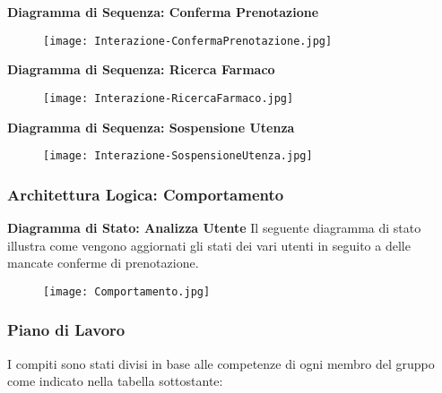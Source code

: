 \textbf{Diagramma di Sequenza: Conferma Prenotazione}

\begin{figure}[h!]
    \begin{center}
        \texttt{[image: Interazione-ConfermaPrenotazione.jpg]}
    \end{center}
\end{figure}
\newpage

\textbf{Diagramma di Sequenza: Ricerca Farmaco}

\begin{figure}[h!]
    \begin{center}
        \texttt{[image: Interazione-RicercaFarmaco.jpg]}
    \end{center}
\end{figure}
\hfill \break

\textbf{Diagramma di Sequenza: Sospensione Utenza}

\begin{figure}[h!]
    \begin{center}
        \texttt{[image: Interazione-SospensioneUtenza.jpg]}
    \end{center}
\end{figure}
\hfill \break

\newpage
\subsubsection{Architettura Logica: Comportamento}
\hfill \break

\textbf{Diagramma di Stato: Analizza Utente}
\hfill \break
Il seguente diagramma di stato illustra come vengono aggiornati gli stati dei
vari utenti in seguito a delle mancate conferme di prenotazione.

\begin{figure}[h!]
    \begin{center}
        \texttt{[image: Comportamento.jpg]}
    \end{center}
\end{figure}
\hfill \break

\newpage
\subsubsection{Piano di Lavoro}

I compiti sono stati divisi in base alle competenze di 
ogni membro del gruppo come indicato nella tabella sottostante:
\hfill \break

